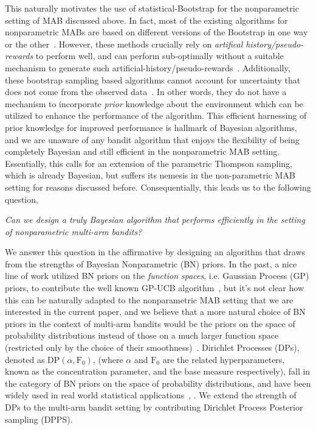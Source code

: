 \documentclass[10pt]{article}
\begin{document}
This naturally motivates the use of statistical-Bootstrap for the nonparametric setting of MAB discussed above. In fact, most of the existing algorithms for nonparametric MABs are based on different versions of the Bootstrap in one way or the other~\citep{kveton2019garbage,baransi2014sub,osband2015bootstrapped}. However, these methods crucially rely on \textit{artifical history/pseudo-rewards} to perform well, and can perform sub-optimally without a suitable mechanism to generate such artificial-history/pseudo-rewards~\citep{osband2015bootstrapped}. Additionally,  these bootstrap sampling based algorithms cannot account for uncertainty that does not come from the observed data~\citep{osband2016deep}. In other words, they do not have a mechanism to incorporate \textit{prior} knowledge about the environment which can be utilized to enhance the performance of the algorithm. This efficient harnessing of prior knowledge for improved performance is hallmark of Bayesian algorithms, and we are unaware of any bandit algorithm that enjoys the flexibility of being completely Bayesian and still efficient in the nonparametric MAB setting. Essentially, this calls for an extension of the parametric Thompson sampling, which is already Bayesian, but suffers its nemesis in the non-parametric MAB setting for reasons discussed before.  Consequentially, this leads us to the following question,

\textit{Can we design a truly Bayesian algorithm that performs efficiently in the setting of nonparametric multi-arm bandits?}

We answer this question in the affirmative by designing an algorithm that draws from the strengths of Bayesian Nonparametric (BN) priors. In the past, a nice line of work utilized BN priors on the \textit{function spaces}, i.e. Gaussian Process (GP) priors, to contribute the well known GP-UCB algorithm~\citep{srinivas2009gaussian}, but it's not clear how this can be naturally adapted to the nonparametric MAB setting that we are interested in the current paper, and we believe that a more natural choice of BN priors in the context of multi-arm bandits would be the priors on the space of probability distributions instead of those on a much larger function space (restricted only by the choice of their smoothness)~\citep{rasmussen2003gaussian}. Dirichlet Processes (DPs), denoted as $\mathrm{DP}(\alpha, \mathrm{F_{0}})$, (where $\alpha$ and $\mathrm{F_{0}}$ are the related hyperparameters, known as the concentration parameter, and the base measure respectively), fall in the category of BN priors on the space of probability distributions, and have been widely used in real world statistical applications~\citep{castillo2024bayesian,muller2015bayesian,ghosal2010dirichlet}, . We extend the strength of DPs to the multi-arm bandit setting by contributing Dirichlet Process Posterior sampling (DPPS). 
\end{document}
